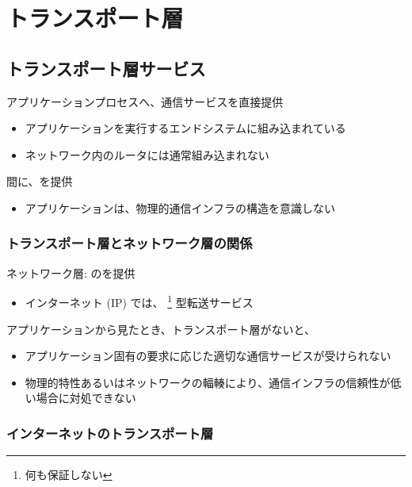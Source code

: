 \section{トランスポート層}

\subsection{トランスポート層サービス}

アプリケーションプロセスへ、通信サービスを直接提供
\begin{itemize}
  \item アプリケーションを実行するエンドシステムに組み込まれている
  \item ネットワーク内のルータには通常組み込まれない
\end{itemize}

間に、を提供
\begin{itemize}
  \item アプリケーションは、物理的通信インフラの構造を意識しない
\end{itemize}


\subsubsection{トランスポート層とネットワーク層の関係}

ネットワーク層: のを提供
\begin{itemize}
  \item[] インターネット (IP) では、
  \footnote{何も保証しない}
  型転送サービス
\end{itemize}
アプリケーションから見たとき、トランスポート層がないと、
\begin{itemize}
  \item アプリケーション固有の要求に応じた適切な通信サービスが受けられない
  \item 物理的特性あるいはネットワークの輻輳により、通信インフラの信頼性が低い場合に対処できない
\end{itemize}



\subsubsection{インターネットのトランスポート層}


